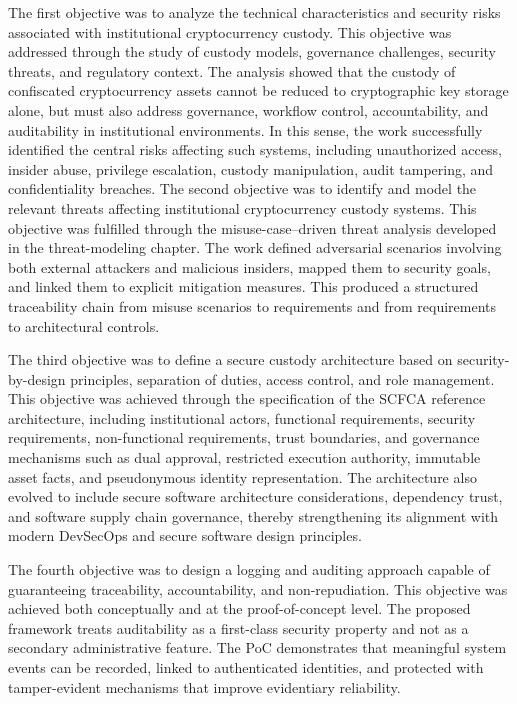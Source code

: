 \documentclass[12pt,a4paper]{report}
\begin{document}
The first objective was to analyze the technical characteristics and security risks associated with institutional cryptocurrency custody. This objective was addressed through the study of custody models, governance challenges, security threats, and regulatory context. The analysis showed that the custody of confiscated cryptocurrency assets cannot be reduced to cryptographic key storage alone, but must also address governance, workflow control, accountability, and auditability in institutional environments. In this sense, the work successfully identified the central risks affecting such systems, including unauthorized access, insider abuse, privilege escalation, custody manipulation, audit tampering, and confidentiality breaches.
The second objective was to identify and model the relevant threats affecting institutional cryptocurrency custody systems. This objective was fulfilled through the misuse-case–driven threat analysis developed in the threat-modeling chapter. The work defined adversarial scenarios involving both external attackers and malicious insiders, mapped them to security goals, and linked them to explicit mitigation measures. This produced a structured traceability chain from misuse scenarios to requirements and from requirements to architectural controls.

The third objective was to define a secure custody architecture based on security-by-design principles, separation of duties, access control, and role management. This objective was achieved through the specification of the SCFCA reference architecture, including institutional actors, functional requirements, security requirements, non-functional requirements, trust boundaries, and governance mechanisms such as dual approval, restricted execution authority, immutable asset facts, and pseudonymous identity representation. The architecture also evolved to include secure software architecture considerations, dependency trust, and software supply chain governance, thereby strengthening its alignment with modern DevSecOps and secure software design principles.

The fourth objective was to design a logging and auditing approach capable of guaranteeing traceability, accountability, and non-repudiation. This objective was achieved both conceptually and at the proof-of-concept level. The proposed framework treats auditability as a first-class security property and not as a secondary administrative feature. The PoC demonstrates that meaningful system events can be recorded, linked to authenticated identities, and protected with tamper-evident mechanisms that improve evidentiary reliability.
\end{document}
